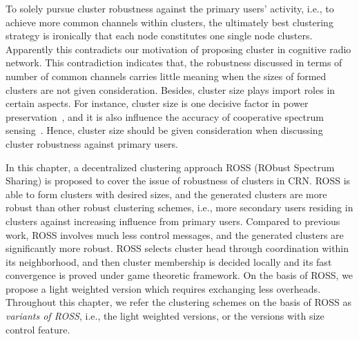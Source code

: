 \documentclass[journal,comsoc]{IEEEtran}
\theoremstyle{mytheoremstyle}
\theoremstyle{mytheoremstyle}
\theoremstyle{mytheoremstyle}
\newcommand{\ie}{i.e., }
\begin{document}

To solely pursue cluster robustness against the primary users' activity, \ie to achieve more common channels within clusters, the ultimately best clustering strategy is ironically that each node constitutes one single node clusters.
Apparently this contradicts our motivation of proposing cluster in cognitive radio network.
This contradiction indicates that, the robustness discussed in terms of number of common channels carries little meaning when the sizes of formed clusters are not given consideration.
Besides, cluster size plays import roles in certain aspects.
For instance, cluster size is one decisive factor in power preservation~\cite{clustering_globecom11, EnergyEfficientClusteringRouting_2015}, and it is also influence the accuracy of cooperative spectrum sensing~\cite{Consensus_based_clustering12}.
Hence, cluster size should be given consideration when discussing cluster robustness against primary users.

In this chapter, a decentralized clustering approach ROSS (RObust Spectrum Sharing) is proposed to cover the issue of robustness of clusters in CRN.
ROSS is able to form clusters with desired sizes, and the generated clusters are more robust than other robust clustering schemes, \ie more secondary users residing in clusters against increasing influence from primary users.
Compared to previous work, ROSS involves much less control messages, and the generated clusters are significantly more robust.
ROSS selects cluster head through coordination within its neighborhood, and then cluster membership is decided locally and its fast convergence is proved under game theoretic framework. 
On the basis of ROSS, we propose a light weighted version which requires exchanging less overheads.
Throughout this chapter, we refer the clustering schemes on the basis of ROSS as \textit{variants of ROSS}, \ie the light weighted versions, or the versions with size control feature. 
\end{document}

